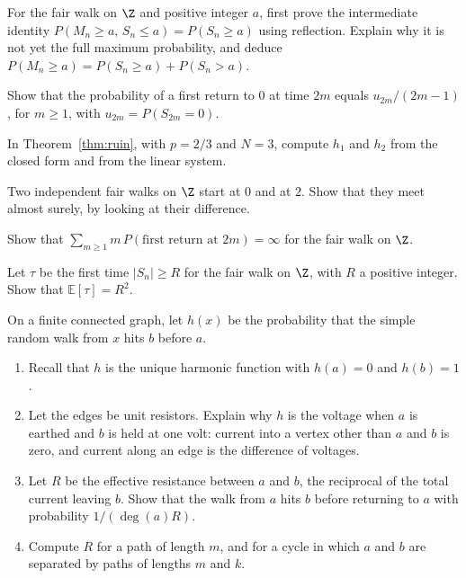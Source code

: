 \begin{exercise}[$\star\star$]\label{ex:maxlaw}
For the fair walk on $\Z$ and positive integer $a$, first prove the intermediate identity $P(M_n\ge a,\,S_n\le a)=P(S_n\ge a)$ using reflection. Explain why it is not yet the full maximum probability, and deduce $P(M_n\ge a)=P(S_n\ge a)+P(S_n>a)$.
\end{exercise}

\begin{exercise}[$\star\star$]\label{ex:timepositive}
Show that the probability of a first return to $0$ at time $2m$ equals $u_{2m}/(2m-1)$, for $m\ge1$, with $u_{2m}=P(S_{2m}=0)$.
\end{exercise}

\begin{exercise}[$\star$]\label{ex:unfair}
In Theorem~\ref{thm:ruin}, with $p=2/3$ and $N=3$, compute $h_1$ and $h_2$ from the closed form and from the linear system.
\end{exercise}

\begin{exercise}[$\star\star$]\label{ex:meet}
Two independent fair walks on $\Z$ start at $0$ and at $2$. Show that they meet almost surely, by looking at their difference.
\end{exercise}

\begin{exercise}[$\star\star$]\label{ex:escape}
Show that $\sum_{m\ge1}m\,P(\text{first return at }2m)=\infty$ for the fair walk on $\Z$.
\end{exercise}

\begin{exercise}[$\star\star$]\label{ex:exittime}
Let $\tau$ be the first time $|S_n|\ge R$ for the fair walk on $\Z$, with $R$ a positive integer. Show that $\mathbb E[\tau]=R^2$.
\end{exercise}

\begin{exercise}[$\star\star$]\label{ex:electric}
On a finite connected graph, let $h(x)$ be the probability that the simple random walk from $x$ hits $b$ before $a$.
\begin{enumerate}[label=(\alph*)]
\item Recall that $h$ is the unique harmonic function with $h(a)=0$ and $h(b)=1$.
\item Let the edges be unit resistors. Explain why $h$ is the voltage when $a$ is earthed and $b$ is held at one volt: current into a vertex other than $a$ and $b$ is zero, and current along an edge is the difference of voltages.
\item Let $R$ be the effective resistance between $a$ and $b$, the reciprocal of the total current leaving $b$. Show that the walk from $a$ hits $b$ before returning to $a$ with probability $1/(\deg(a)R)$.
\item Compute $R$ for a path of length $m$, and for a cycle in which $a$ and $b$ are separated by paths of lengths $m$ and $k$.
\end{enumerate}
\end{exercise}

